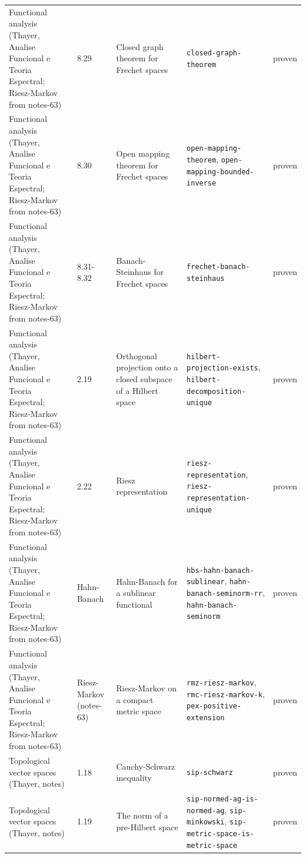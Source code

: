 \begin{longtable}{@{}ll>{\raggedright\arraybackslash}p{4.2cm}>{\raggedright\arraybackslash}p{4.2cm}l@{}}
Functional analysis (Thayer, Analise Funcional e Teoria Espectral; Riesz-Markov from notes-63) & 8.29 & Closed graph theorem for Frechet spaces & \texttt{closed-\allowbreak{}graph-\allowbreak{}theorem} & proven \\
Functional analysis (Thayer, Analise Funcional e Teoria Espectral; Riesz-Markov from notes-63) & 8.30 & Open mapping theorem for Frechet spaces & \texttt{open-\allowbreak{}mapping-\allowbreak{}theorem}, \texttt{open-\allowbreak{}mapping-\allowbreak{}bounded-\allowbreak{}inverse} & proven \\
Functional analysis (Thayer, Analise Funcional e Teoria Espectral; Riesz-Markov from notes-63) & 8.31-8.32 & Banach-Steinhaus for Frechet spaces & \texttt{frechet-\allowbreak{}banach-\allowbreak{}steinhaus} & proven \\
Functional analysis (Thayer, Analise Funcional e Teoria Espectral; Riesz-Markov from notes-63) & 2.19 & Orthogonal projection onto a closed subspace of a Hilbert space & \texttt{hilbert-\allowbreak{}projection-\allowbreak{}exists}, \texttt{hilbert-\allowbreak{}decomposition-\allowbreak{}unique} & proven \\
Functional analysis (Thayer, Analise Funcional e Teoria Espectral; Riesz-Markov from notes-63) & 2.22 & Riesz representation & \texttt{riesz-\allowbreak{}representation}, \texttt{riesz-\allowbreak{}representation-\allowbreak{}unique} & proven \\
Functional analysis (Thayer, Analise Funcional e Teoria Espectral; Riesz-Markov from notes-63) & Hahn-Banach & Hahn-Banach for a sublinear functional & \texttt{hbs-\allowbreak{}hahn-\allowbreak{}banach-\allowbreak{}sublinear}, \texttt{hahn-\allowbreak{}banach-\allowbreak{}seminorm-\allowbreak{}rr}, \texttt{hahn-\allowbreak{}banach-\allowbreak{}seminorm} & proven \\
Functional analysis (Thayer, Analise Funcional e Teoria Espectral; Riesz-Markov from notes-63) & Riesz-Markov (notes-63) & Riesz-Markov on a compact metric space & \texttt{rmz-\allowbreak{}riesz-\allowbreak{}markov}, \texttt{rmc-\allowbreak{}riesz-\allowbreak{}markov-\allowbreak{}k}, \texttt{pex-\allowbreak{}positive-\allowbreak{}extension} & proven \\
Topological vector spaces (Thayer, notes) & 1.18 & Cauchy-Schwarz inequality & \texttt{sip-\allowbreak{}schwarz} & proven \\
Topological vector spaces (Thayer, notes) & 1.19 & The norm of a pre-Hilbert space & \texttt{sip-\allowbreak{}normed-\allowbreak{}ag-\allowbreak{}is-\allowbreak{}normed-\allowbreak{}ag}, \texttt{sip-\allowbreak{}minkowski}, \texttt{sip-\allowbreak{}metric-\allowbreak{}space-\allowbreak{}is-\allowbreak{}metric-\allowbreak{}space} & proven \\

\end{longtable}
